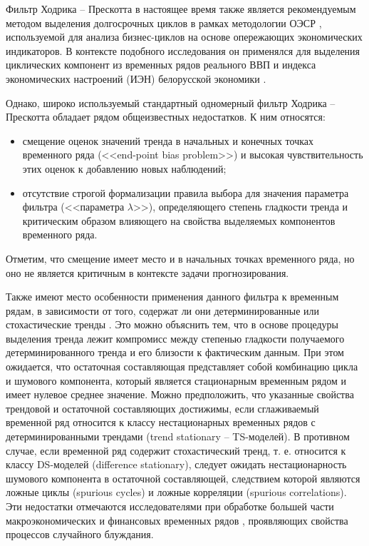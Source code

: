 \documentclass[a4paper,14pt]{extreport}
\begin{document}
	Фильтр Ходрика -- Прескотта в настоящее время также является рекомендуемым методом выделения долгосрочных циклов в рамках методологии ОЭСР \cite{oecdCLI, oecdCycleExtraction}, используемой для анализа бизнес-циклов на основе опережающих экономических индикаторов. В контексте подобного исследования он применялся для выделения циклических компонент из временных рядов реального ВВП и индекса экономических настроений (ИЭН) белорусской экономики \cite{esiMakingAlt}. 
	
	Однако, широко используемый стандартный одномерный фильтр Ходрика -- Прескотта обладает рядом общеизвестных недостатков.  К ним относятся: 
	
	\begin{itemize}
		\item смещение оценок значений тренда в начальных и конечных точках временного ряда (<<end-point bias problem>>) и высокая чувствительность этих оценок к добавлению новых наблюдений; 
		\item отсутствие строгой формализации правила выбора для значения параметра фильтра (<<параметра $\lambda$>>), определяющего степень гладкости тренда и критическим образом влияющего на свойства выделяемых компонентов временного ряда.
	\end{itemize}
	
	Отметим, что смещение имеет место и в начальных точках временного ряда, но оно не является критичным в контексте задачи прогнозирования.
	
	Также имеют место особенности применения данного фильтра к временным рядам, в зависимости от того, содержат ли они детерминированные или стохастические тренды \cite{kharin8}. Это можно объяснить тем, что в основе процедуры выделения тренда лежит компромисс между степенью гладкости получаемого детерминированного тренда и его близости к фактическим данным. При этом ожидается, что остаточная составляющая представляет собой комбинацию цикла и шумового компонента, который является стационарным временным рядом и имеет нулевое среднее значение. Можно предположить, что указанные свойства трендовой и остаточной составляющих достижимы, если сглаживаемый временной ряд относится к классу нестационарных временных рядов с детерминированными трендами (trend stationary -- TS-моделей).  В противном случае, если временной ряд содержит стохастический тренд, т. е. относится к классу DS-моделей (difference stationary), следует ожидать нестационарность шумового компонента в остаточной составляющей, следствием которой являются ложные циклы (spurious cycles) и ложные корреляции (spurious correlations). Эти недостатки отмечаются исследователями при обработке большей части макроэкономических и финансовых временных рядов \cite{schuler_detrend, harvey_detrend, pederson_hp}, проявляющих свойства процессов случайного блуждания.
	
\end{document}
